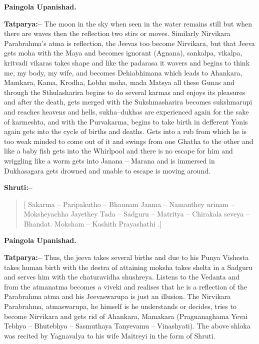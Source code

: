 \begin{flushright}
\textbf{Paingola Upanishad.}
\end{flushright}

\textbf{Tatparya:–} The moon in the sky when seen in the water remains still but when there are waves then the reflection two stirs or moves. Similarly Nirvikara Parabrahma's atma is reflection, the Jeevas too become Nirvikara, but that Jeeva gets moha with the Maya and becomes ignorant (Agnana), sankalpa, vikalpa, kritvadi vikaras takes shape and like the padarasa it wavers and begins to think me, my body, my wife, and becomes Dehiabhimana which leads to Ahankara, Mamkara, Kama, Krodha, Lobha moha, mada Matsya all these Gunas and through the Sthulasharira begins to do several karmas and enjoys its pleasures and after the death, gets merged with the Sukshmasharira becomes sukshmarupi and reaches heavens and hells, sukha–dukhas are experienced again for the sake of karmeshta, and with the Purvakarma, begins to take birth in defferent Yonis again gets into the cycle of births and deaths. Gets into a rub from which he is too weak minded to come out of it and swings from one Ghatha to the other and like a baby fish gets into the Whirlpool and there is no escape for him and wriggling like a worm gets into Janana – Marana and is immersed in Dukhasagara gets drowned and unable to escape is moving around.

\textbf{Shruti:–}

\begin{verse}
[ Sakarma – Paripakutho – Bhaunam Janma – Namanthey nrinam – Moksheyachha Jayethey  Tada – Sadguru – Matritya – Chirakala seveya – Bhandat. Moksham – Kashith Prayashathi .]
\end{verse}

\begin{flushright}
\textbf{Paingola Upanishad.}
\end{flushright}

\textbf{Tatparya:–} Thus, the jeeva takes several births and due to his Punya Vishesta takes human birth with the destra of attaining moksha takes shelta in a Sadguru and serves him with the chaturavidha shushreya. Listens to the Vedanta and from the atmanatma becomes a viveki and realises that he is a reflection of the Parabrahma atma and his Jeevaswarupa is just an illusion. The Nirvikara Parabrahma, atmaswarupa, he himself is he understands or decides, tries to become Nirvikara and gets rid of Ahankara, Mamakara (Pragnanaghama Yevai Tebhyo – Bhutebhyo – Sasmuthaya Tanyevamu – Vinashyati). The above shloka was recited by Yagnavalya to his wife Maitreyi in the form of Shruti.

